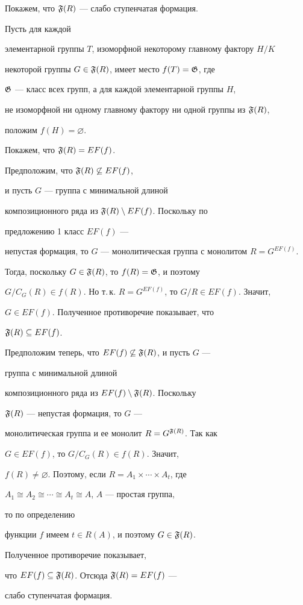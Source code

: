 \begin{pf}
Покажем, что $\frak{F}(R)$ --- слабо ступенчатая формация.


Пусть для каждой


элементарной группы $T$, изоморфной некоторому главному фактору $H/K$


некоторой группы $G\in\frak{F}(R)$, имеет место $f(T)=\frak{G}$, где


$\frak{G}$ --- класс всех групп, а для каждой элементарной группы $H$,


не изоморфной ни одному главному фактору ни одной группы из $\frak{F}(R)$, 


положим $f(H)=\varnothing$.


Покажем, что $\frak{F}(R)=EF(f)$.


Предположим, что $\frak{F}(R)\not\subseteq EF(f)$,


и пусть $G$ --- группа с минимальной длиной


композиционного ряда из $\frak{F}(R)\setminus EF(f)$. Поскольку по


предложению 1 класс $EF(f)$ ---


непустая формация, то $G$ --- монолитическая группа с монолитом $R=G^{EF(f)}$.


Тогда, поскольку $G\in\frak{F}(R)$, то $f(R)=\frak{G}$, и поэтому


$G/C_G(R)\in f(R)$. Но т.\,к. $R=G^{EF(f)}$, то $G/R\in EF(f)$. Значит,


$G\in EF(f)$. Полученное противоречие показывает, что


$\frak{F}(R)\subseteq EF(f)$.


Предположим теперь, что $EF(f)\not\subseteq\frak{F}(R)$, и пусть $G$ ---


группа с минимальной длиной


композиционного ряда из $EF(f)\setminus\frak{F}(R)$. Поскольку


$\frak{F}(R)$ --- непустая формация, то $G$ ---


монолитическая группа и ее монолит $R=G^{\frak{F}(R)}$. Так как


$G\in EF(f)$, то $G/C_G(R)\in f(R)$. Значит,


$f(R)\ne\varnothing$. Поэтому, если $R=A_1\times\dotsb\times A_t$, где


$A_1\cong A_2\cong\dotsb\cong A_t\cong A$, $A$ --- простая группа,


то по определению


функции $f$ имеем $t\in R(A)$, и поэтому $G\in\frak{F}(R)$.


Полученное противоречие показывает,


что $EF(f)\subseteq\frak{F}(R)$. Отсюда $\frak{F}(R)=EF(f)$ ---


слабо ступенчатая формация.


\end{pf}





